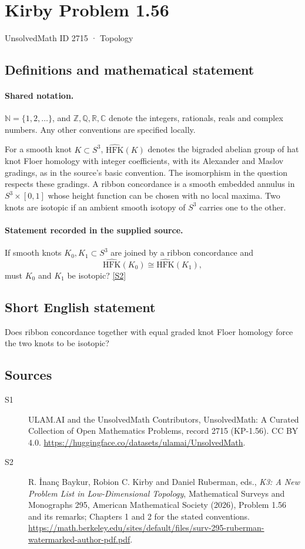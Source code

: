 \documentclass[11pt]{article}
\newcommand{\sref}[2]{\hyperlink{source:#1:#2}{[S#2]}}
\begin{document}
\setcounter{section}{2714}
\section{Kirby Problem 1.56}\label{2715}
{\small\sffamily UnsolvedMath ID 2715 · Topology}
\subsection{Definitions and mathematical statement}

\paragraph{Shared notation.}$\mathbb N=\{1,2,\ldots\}$, and $\mathbb Z,\mathbb Q,\mathbb R,\mathbb C$ denote the integers, rationals, reals and complex numbers. Any other conventions are specified locally.


For a smooth knot $K\subset S^3$, $\widehat{\mathrm{HFK}}(K)$ denotes the bigraded abelian group of hat knot Floer homology with integer coefficients, with its Alexander and Maslov gradings, as in the source’s basic convention. The isomorphism in the question respects these gradings. A ribbon concordance is a smooth embedded annulus in $S^3\times[0,1]$ whose height function can be chosen with no local maxima. Two knots are isotopic if an ambient smooth isotopy of $S^3$ carries one to the other.
\paragraph{Statement recorded in the supplied source.}
If smooth knots $K_0,K_1\subset S^3$ are joined by a ribbon concordance and
\[\widehat{\mathrm{HFK}}(K_0)\cong\widehat{\mathrm{HFK}}(K_1),\]
must $K_0$ and $K_1$ be isotopic? \sref{2715}{2}

\subsection{Short English statement}
Does ribbon concordance together with equal graded knot Floer homology force the two knots to be isotopic?
\subsection{Sources}
\begin{description}
\item[\hypertarget{source:2715:1}{S1}] ULAM.AI and the UnsolvedMath Contributors, UnsolvedMath: A Curated Collection of Open Mathematics Problems, record 2715 (KP-1.56). CC BY 4.0. \url{https://huggingface.co/datasets/ulamai/UnsolvedMath}.
\item[\hypertarget{source:2715:2}{S2}] R. İnanç Baykur, Robion C. Kirby and Daniel Ruberman, eds., \emph{K3: A New Problem List in Low-Dimensional Topology}, Mathematical Surveys and Monographs 295, American Mathematical Society (2026), Problem 1.56 and its remarks; Chapters 1 and 2 for the stated conventions. \url{https://math.berkeley.edu/sites/default/files/surv-295-ruberman-watermarked-author-pdf.pdf}.
\end{description}
\label{end:2715}
\end{document}
